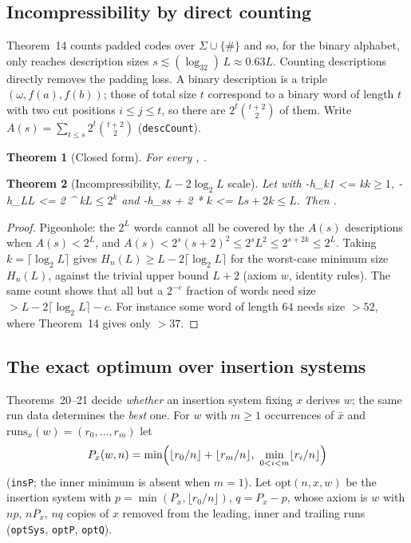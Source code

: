 \documentclass[11pt]{article}
\newtheorem{theorem}{Theorem}
\theoremstyle{definition}
\theoremstyle{remark}
\begin{document}
\subsection{Incompressibility by direct counting}

Theorem~14 counts padded codes over $\Sigma\cup\{\#\}$ and so, for the binary alphabet, only
reaches description sizes $s\lesssim(\log_32)\,L\approx0.63L$. Counting descriptions directly
removes the padding loss. A binary description is a triple $(\omega,f(a),f(b))$; those of
total size $t$ correspond to a binary word of length $t$ with two cut positions $i\le j\le t$,
so there are $2^t\binom{t+2}{2}$ of them. Write $A(s)=\sum_{t\le s}2^t\binom{t+2}{2}$
(\texttt{descCount}).

\begin{theorem}[Closed form]
For every , .
\end{theorem}

\begin{theorem}[Incompressibility, $L-2\log_2L$ scale]
Let  with \hyp{h_k}{1 <= k}{$k\ge1$}, \hyp{h_L}{L <= 2 ^ k}{$L\le2^k$}
and \hyp{h_s}{s + 2 * k <= L}{$s+2k\le L$}. Then
.
\end{theorem}
\begin{proof}
Pigeonhole: the $2^L$ words cannot all be covered by the $A(s)$ descriptions when
$A(s)<2^L$, and $A(s)<2^s(s+2)^2\le2^sL^2\le2^{s+2k}\le2^L$. Taking $k=\lceil\log_2L\rceil$
gives $H_n(L)\ge L-2\lceil\log_2L\rceil$ for the worst-case minimum size $H_n(L)$, against the
trivial upper bound $L+2$ (axiom $w$, identity rules). The same count shows that all but a
$2^{-c}$ fraction of words need size $>L-2\lceil\log_2L\rceil-c$. For instance some word of
length $64$ needs size $>52$, where Theorem~14 gives only $>37$.
\end{proof}

\subsection{The exact optimum over insertion systems}

Theorems~20--21 decide \emph{whether} an insertion system fixing $x$ derives $w$; the same run
data determines the \emph{best} one. For $w$ with $m\ge1$ occurrences of $\bar x$ and
$\mathrm{runs}_x(w)=(r_0,\dots,r_m)$ let
\[
P_x(w,n)=\min\Bigl(\lfloor r_0/n\rfloor+\lfloor r_m/n\rfloor,\ \min_{0<i<m}\lfloor r_i/n\rfloor\Bigr)
\]
(\texttt{insP}; the inner minimum is absent when $m=1$). Let $\mathrm{opt}(n,x,w)$ be the
insertion system with $p=\min(P_x,\lfloor r_0/n\rfloor)$, $q=P_x-p$, whose axiom is $w$ with
$np$, $nP_x$, $nq$ copies of $x$ removed from the leading, inner and trailing runs
(\texttt{optSys}, \texttt{optP}, \texttt{optQ}).
\end{document}
